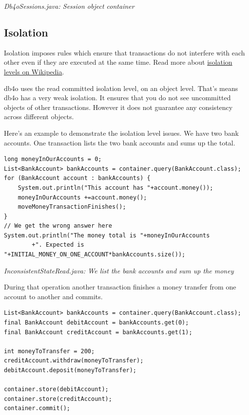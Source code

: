 {\small\itshape Db4oSessions.java: Session object container\par}
\medskip

\subsection{Isolation}
\label{ref:basics-acid-and-transactions-isolation}

Isolation imposes rules which ensure that transactions do not interfere with each other even if they are executed at the same time. Read more about \href{http://en.wikipedia.org/wiki/Isolation_level}{isolation levels on Wikipedia}.

db4o uses the read committed isolation level, on an object level. That's means db4o has a very weak isolation. It ensures that you do not see uncommitted objects of other transactions. However it does not guarantee any consistency across different objects.

Here's an example to demonstrate the isolation level issues. We have two bank accounts. One transaction lists the two bank accounts and sums up the total.

\begin{lstlisting}
long moneyInOurAccounts = 0;
List<BankAccount> bankAccounts = container.query(BankAccount.class);
for (BankAccount account : bankAccounts) {
    System.out.println("This account has "+account.money());
    moneyInOurAccounts +=account.money();
    moveMoneyTransactionFinishes();
}
// We get the wrong answer here
System.out.println("The money total is "+moneyInOurAccounts
        +". Expected is "+INITIAL_MONEY_ON_ONE_ACCOUNT*bankAccounts.size());
\end{lstlisting}

{\small\itshape InconsistentStateRead.java: We list the bank accounts and sum up the money\par}
\medskip

During that operation another transaction finishes a money transfer from one account to another and commits.

\begin{lstlisting}
List<BankAccount> bankAccounts = container.query(BankAccount.class);
final BankAccount debitAccount = bankAccounts.get(0);
final BankAccount creditAccount = bankAccounts.get(1);

int moneyToTransfer = 200;
creditAccount.withdraw(moneyToTransfer);
debitAccount.deposit(moneyToTransfer);

container.store(debitAccount);
container.store(creditAccount);
container.commit();
\end{lstlisting}

